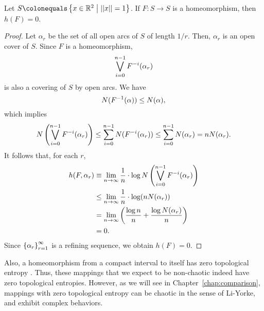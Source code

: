 \documentclass[10pt,twoside,draft]{book}
\begin{document}
\begin{proposition}
  \citep{akm}
  Let $S \ceq \setst{x \in \R^2}{\norm{x} = 1}$.
  If $F: S \to S$ is a homeomorphism, then $h(F) = 0$.
  \begin{proof}
    Let $\alpha_r$ be the set of all open arcs of $S$ of length $1/r$.
    Then, $\alpha_r$ is an open cover of $S$.
    Since $F$ is a homeomorphism, 
    \begin{equation*}
      \bigvee\limits_{i = 0}^{n-1} F^{-i}(\alpha_r)
    \end{equation*}
    is also a covering of $S$ by open arcs.
    We have
    \begin{equation*}
      N(F^{-1}(\alpha)) \leq N(\alpha),
    \end{equation*}
    which implies
    \begin{equation*}
      N\left (  \bigvee\limits_{i = 0}^{n-1} F^{-i}(\alpha_r)  \right )
      \leq \sum\limits_{i = 0}^{n-1} N(F^{-i}(\alpha_r))
      \leq \sum\limits_{i = 0}^{n-1} N(\alpha_r)
      = n N(\alpha_r).
    \end{equation*}
    It follows that, for each $r$,
    \begin{align*}
      h(F, \alpha_r) 
      &\equiv \lim\limits_{n \to \infty} \frac{1}{n} \cdot \log N\left (  \bigvee\limits_{i = 0}^{n-1} F^{-i}(\alpha_r)  \right )  \\
      &\leq \lim\limits_{n \to \infty} \frac{1}{n} \cdot \log (n N(\alpha_r))  \\
      &= \lim\limits_{n \to \infty}\left (  \frac{\log n}{n} + \frac{\log N(\alpha_r)}{n}  \right ) \\
      &= 0.
    \end{align*}
    Since $\left \{ \alpha_r \right \}^{\infty}_{r = 1}$ is a refining sequence, we obtain $h(F) = 0$.
  \end{proof}
\end{proposition}
Also, a homeomorphism from a compact interval to itself has zero topological entropy \citep[p.180]{walters}.
Thus, these mappings that we expect to be non-chaotic indeed have zero topological entropies. 
However, as we will see in Chapter~\ref{chap:comparison}, mappings with zero topological entropy can be chaotic in the sense of Li-Yorke, and exhibit complex behaviors.




\printindex
\end{document}
